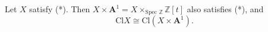 Let $X$ satisfy (*). Then $X \times \mathbf{A}^1 = X \times_{\text{Spec } \mathbb{Z}} \mathbb{Z}[t]$ also satisfies (*), and
$$\text{Cl} X \cong \text{Cl}(X \times \mathbf{A}^1).$$
